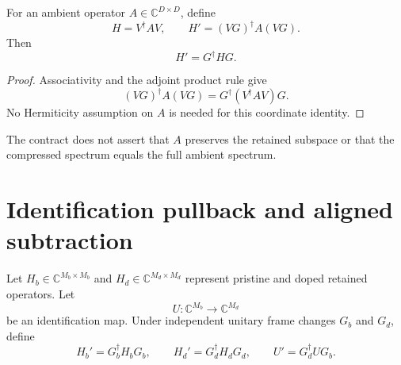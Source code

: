 
\begin{proposition}
\label{prop:compression-covariance}
For an ambient operator $A\in\mathbb C^{D\times D}$, define
\begin{equation}
  H=V^{\dagger}AV,
  \qquad
  H'=(VG)^{\dagger}A(VG).
\end{equation}
Then
\begin{equation}
  H'=G^{\dagger}HG.
\end{equation}
\end{proposition}

\begin{proof}
Associativity and the adjoint product rule give
\begin{equation}
  (VG)^{\dagger}A(VG)
  =G^{\dagger}(V^{\dagger}AV)G.
\end{equation}
No Hermiticity assumption on $A$ is needed for this coordinate identity.
\end{proof}

The contract does not assert that $A$ preserves the retained subspace or that
the compressed spectrum equals the full ambient spectrum.

\section{Identification pullback and aligned subtraction}


Let $H_b\in\mathbb C^{M_b\times M_b}$ and
$H_d\in\mathbb C^{M_d\times M_d}$ represent pristine and doped retained
operators. Let
\begin{equation}
  U:\mathbb C^{M_b}\longrightarrow\mathbb C^{M_d}
\end{equation}
be an identification map. Under independent unitary frame changes $G_b$ and
$G_d$, define
\begin{equation}
  H_b'=G_b^{\dagger}H_bG_b,
  \qquad
  H_d'=G_d^{\dagger}H_dG_d,
  \qquad
  U'=G_d^{\dagger}UG_b.
\end{equation}

